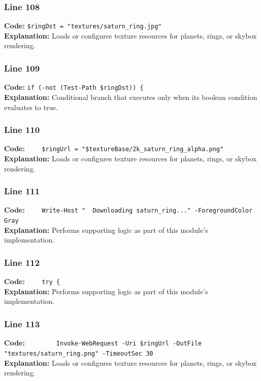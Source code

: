 \documentclass[11pt,a4paper]{article}
\begin{document}
\subsubsection*{Line 108}
\textbf{Code:} \verb|$ringDst = "textures/saturn_ring.jpg"|\\
\textbf{Explanation:} Loads or configures texture resources for planets, rings, or skybox rendering.

\subsubsection*{Line 109}
\textbf{Code:} \verb|if (-not (Test-Path $ringDst)) {|\\
\textbf{Explanation:} Conditional branch that executes only when its boolean condition evaluates to true.

\subsubsection*{Line 110}
\textbf{Code:} \verb|    $ringUrl = "$textureBase/2k_saturn_ring_alpha.png"|\\
\textbf{Explanation:} Loads or configures texture resources for planets, rings, or skybox rendering.

\subsubsection*{Line 111}
\textbf{Code:} \verb|    Write-Host "  Downloading saturn_ring..." -ForegroundColor Gray|\\
\textbf{Explanation:} Performs supporting logic as part of this module's implementation.

\subsubsection*{Line 112}
\textbf{Code:} \verb|    try {|\\
\textbf{Explanation:} Performs supporting logic as part of this module's implementation.

\subsubsection*{Line 113}
\textbf{Code:} \verb|        Invoke-WebRequest -Uri $ringUrl -OutFile "textures/saturn_ring.png" -TimeoutSec 30|\\
\textbf{Explanation:} Loads or configures texture resources for planets, rings, or skybox rendering.
\end{document}
